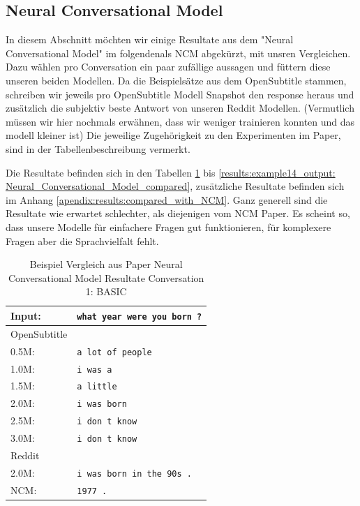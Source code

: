 \subsection{Neural Conversational Model}
In diesem Abschnitt möchten wir einige Resultate aus dem "Neural Conversational Model" im folgendenals NCM abgekürzt, mit unsren Vergleichen. Dazu wählen pro Conversation ein paar zufällige aussagen und füttern diese unseren beiden Modellen. Da die Beispielsätze aus dem OpenSubtitle stammen, schreiben wir jeweils pro OpenSubtitle Modell Snapshot den response heraus und zusätzlich die subjektiv beste Antwort von unseren Reddit Modellen. (Vermutlich müssen wir hier nochmals erwähnen, dass wir weniger trainieren konnten und das modell kleiner ist)
Die jeweilige Zugehörigkeit zu den Experimenten im Paper, sind in der Tabellenbeschreibung vermerkt.

Die Resultate befinden sich in den Tabellen \ref{results:example8_output: Neural_Conversational_Model_compared} bis \ref{results:example14_output: Neural_Conversational_Model_compared}, zusätzliche Resultate befinden sich im Anhang \ref{apendix:results:compared_with_NCM}. Ganz generell sind die Resultate wie erwartet schlechter, als diejenigen vom NCM Paper. Es scheint so, dass unsere Modelle für einfachere Fragen gut funktionieren, für komplexere Fragen aber die Sprachvielfalt fehlt. 
\begin{table}[H]
	\centering
	\begin{adjustbox}{max width=\textwidth}
		\begin{tabular}{ll}
			\toprule
			Input: 	& \texttt{what year were you born ?}\\
			\midrule
			OpenSubtitle\\
			0.5M: 	& \texttt{a lot of people}\\
			1.0M: 	& \texttt{i was a}\\
			1.5M:	& \texttt{a little}\\
			2.0M:	& \texttt{i was born}\\
			2.5M:	& \texttt{i don t know}\\
			3.0M:	& \texttt{i don t know}\\
			\midrule
			Reddit\\
			2.0M:	& \texttt{i was born in the 90s .}\\
			\midrule
			NCM:	& \texttt{1977 .}\\
			\bottomrule
		\end{tabular}
	\end{adjustbox}
	\caption{Beispiel Vergleich aus Paper Neural Conversational Model Resultate Conversation 1: BASIC }
	\label{results:example8_output: Neural_Conversational_Model_compared}
\end{table}

